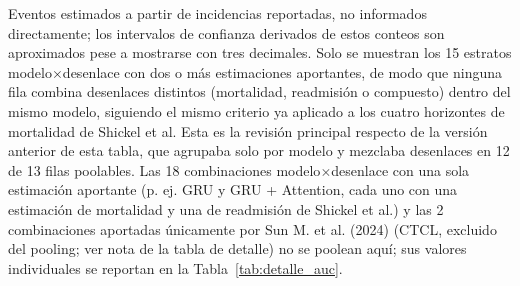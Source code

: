 \begin{table}[H]
\par\vspace{0.4em}\footnotesize * Eventos estimados a partir de incidencias reportadas, no informados directamente; los intervalos de confianza derivados de estos conteos son aproximados pese a mostrarse con tres decimales. Solo se muestran los 15 estratos modelo$\times$desenlace con dos o más estimaciones aportantes, de modo que ninguna fila combina desenlaces distintos (mortalidad, readmisión o compuesto) dentro del mismo modelo, siguiendo el mismo criterio ya aplicado a los cuatro horizontes de mortalidad de Shickel et al. Esta es la revisión principal respecto de la versión anterior de esta tabla, que agrupaba solo por modelo y mezclaba desenlaces en 12 de 13 filas poolables. Las 18 combinaciones modelo$\times$desenlace con una sola estimación aportante (p. ej. GRU y GRU + Attention, cada uno con una estimación de mortalidad y una de readmisión de Shickel et al.) y las 2 combinaciones aportadas únicamente por Sun M. et al. (2024) (CTCL, excluido del pooling; ver nota de la tabla de detalle) no se poolean aquí; sus valores individuales se reportan en la Tabla~\ref{tab:detalle_auc}.
\end{table}
